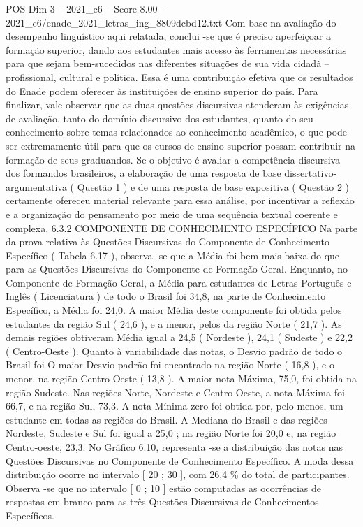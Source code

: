 \begin{textsample}{POS Dim 3 – 2021\_c6 – Score 8.00 – 2021\_c6/enade\_2021\_letras\_ing\_8809dcbd12.txt}
Com base na avaliação do desempenho linguístico aqui relatada, conclui -se que é preciso aperfeiçoar a formação superior, dando aos estudantes mais acesso às ferramentas necessárias para que sejam bem-sucedidos nas diferentes situações de sua vida cidadã – profissional, cultural e política.
Essa é uma contribuição efetiva que os resultados do Enade podem oferecer às instituições de ensino superior do país.
Para finalizar, vale observar que as duas questões discursivas atenderam às exigências de avaliação, tanto do domínio discursivo dos estudantes, quanto do seu conhecimento sobre temas relacionados ao conhecimento acadêmico, o que pode ser extremamente útil para que os cursos de ensino superior possam contribuir na formação de seus graduandos.
Se o objetivo é avaliar a competência discursiva dos formandos brasileiros, a elaboração de uma resposta de base dissertativo-argumentativa ( Questão 1 ) e de uma resposta de base expositiva ( Questão 2 ) certamente ofereceu material relevante para essa análise, por incentivar a reflexão e a organização do pensamento por meio de uma sequência textual coerente e complexa. 6.3.2 COMPONENTE DE CONHECIMENTO ESPECÍFICO Na parte da prova relativa às Questões Discursivas do Componente de Conhecimento Específico ( Tabela 6.17 ), observa -se que a Média foi bem mais baixa do que para as Questões Discursivas do Componente de Formação Geral.
Enquanto, no Componente de Formação Geral, a Média para estudantes de Letras-Português e Inglês ( Licenciatura ) de todo o Brasil foi 34,8, na parte de Conhecimento Específico, a Média foi 24,0.
A maior Média deste componente foi obtida pelos estudantes da região Sul ( 24,6 ), e a menor, pelos da região Norte ( 21,7 ).
As demais regiões obtiveram Média igual a 24,5 ( Nordeste ), 24,1 ( Sudeste ) e 22,2 ( Centro-Oeste ).
Quanto à variabilidade das notas, o Desvio padrão de todo o Brasil foi O maior Desvio padrão foi encontrado na região Norte ( 16,8 ), e o menor, na região Centro-Oeste ( 13,8 ).
A maior nota Máxima, 75,0, foi obtida na região Sudeste.
Nas regiões Norte, Nordeste e Centro-Oeste, a nota Máxima foi 66,7, e na região Sul, 73,3.
A nota Mínima zero foi obtida por, pelo menos, um estudante em todas as regiões do Brasil.
A Mediana do Brasil e das regiões Nordeste, Sudeste e Sul foi igual a 25,0 ; na região Norte foi 20,0 e, na região Centro-oeste, 23,3.
No Gráfico 6.10, representa -se a distribuição das notas nas Questões Discursivas no Componente de Conhecimento Específico.
A moda dessa distribuição ocorre no intervalo [ 20 ; 30 ], com 26,4 \% do total de participantes.
Observa -se que no intervalo [ 0 ; 10 ] estão computadas as ocorrências de respostas em branco para as três Questões Discursivas de Conhecimentos Específicos.

\end{textsample}
